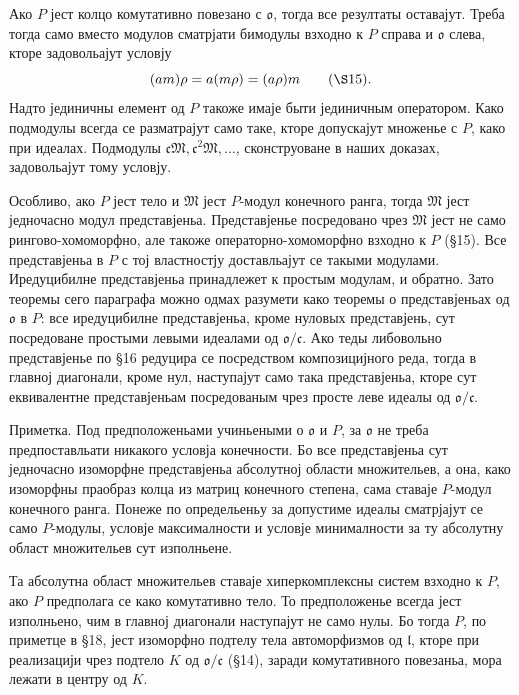 ﻿\documentclass[11pt]{article}
\providecommand{\mo}{\mathfrak{o}}
\providecommand{\ml}{\mathfrak{l}}
\providecommand{\mc}{\mathfrak{c}}
\providecommand{\mM}{\mathfrak{M}}
\begin{document}
Ако $P$ јест колцо комутативно повезано с $\mo$, тогда все резултаты оставајут. Треба тогда само вместо модулов сматрјати бимодулы взходно к $P$ справа и $\mo$ слева, кторе задовольајут условју
\[
        (am)\rho=a(m\rho)=(a\rho)m \qquad(\S 15).
\]
Надто јединичны елемент од $P$ такоже имаје быти јединичным оператором. Како подмодулы всегда се разматрајут само таке, кторе допускајут множенье с $P$, како при идеалах. Подмодулы $\mc\mM,\mc^2\mM,\ldots$, сконструоване в наших доказах, задовольајут тому условју.

Особливо, ако $P$ јест тело и $\mM$ јест $P$-модул конечного ранга, тогда $\mM$ јест једночасно модул представјеньа. Представјенье посредовано чрез $\mM$ јест не само рингово-хомоморфно, але такоже операторно-хомоморфно взходно к $P$ (§15). Все представјеньа в $P$ с тој властностју доставльајут се такыми модулами. Иредуцибилне представјеньа принадлежет к простым модулам, и обратно. Зато теоремы сего параграфа можно одмах разумети како теоремы о представјеньах од $\mo$ в $P$: все иредуцибилне представјеньа, кроме нуловых представјень, сут посредоване простыми левыми идеалами од $\mo/\mc$. Ако теды либовольно представјенье по §16 редуцира се посредством композицијного реда, тогда в главној диагонали, кроме нул, наступајут само така представјеньа, кторе сут еквивалентне представјеньам посредованым чрез просте леве идеалы од $\mo/\mc$.

Приметка. Под предположеньами учиньеными о $\mo$ и $P$, за $\mo$ не треба предпоставльати никакого условја конечности. Бо все представјеньа сут једночасно изоморфне представјеньа абсолутној области множительев, а она, како изоморфны праобраз колца из матриц конечного степена, сама ставаје $P$-модул конечного ранга. Понеже по определьеньу за допустиме идеалы сматрјајут се само $P$-модулы, условје максималности и условје минималности за ту абсолутну област множительев сут изполньене.

Та абсолутна област множительев ставаје хиперкомплексны систем взходно к $P$, ако $P$ предполага се како комутативно тело. То предположенье всегда јест изполньено, чим в главној диагонали наступајут не само нулы. Бо тогда $P$, по приметце в §18, јест изоморфно подтелу тела автоморфизмов од $\ml$, кторе при реализацији чрез подтело $K$ од $\mo/\mc$ (§14), заради комутативного повезаньа, мора лежати в центру од $K$.
\end{document}
